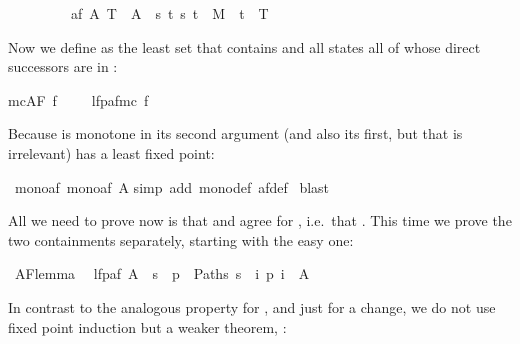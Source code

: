 \begin{isabellebody}
\ \ \ \ \ \ \ \ \ {\isachardoublequote}af\ A\ T\ {\isasymequiv}\ A\ {\isasymunion}\ {\isacharbraceleft}s{\isachardot}\ {\isasymforall}t{\isachardot}\ {\isacharparenleft}s{\isacharcomma}\ t{\isacharparenright}\ {\isasymin}\ M\ {\isasymlongrightarrow}\ t\ {\isasymin}\ T{\isacharbraceright}{\isachardoublequote}%
\begin{isamarkuptext}%
\noindent
Now we define  as the least set  that contains
 and all states all of whose direct successors are in :%
\end{isamarkuptext}%
{\isachardoublequote}mc{\isacharparenleft}AF\ f{\isacharparenright}\ \ \ \ {\isacharequal}\ lfp{\isacharparenleft}af{\isacharparenleft}mc\ f{\isacharparenright}{\isacharparenright}{\isachardoublequote}%
\begin{isamarkuptext}%
\noindent
Because  is monotone in its second argument (and also its first, but
that is irrelevant)  has a least fixed point:%
\end{isamarkuptext}%
\ mono{\isacharunderscore}af{\isacharcolon}\ {\isachardoublequote}mono{\isacharparenleft}af\ A{\isacharparenright}{\isachardoublequote}\isanewline
{}simp\ add{\isacharcolon}\ mono{\isacharunderscore}def\ af{\isacharunderscore}def{\isacharparenright}\isanewline
{}\ blast\isanewline
{}%
\begin{isamarkuptext}%
All we need to prove now is that  and \isa{{\isasymTurnstile}}
agree for , i.e.\ that . This time we prove the two containments separately, starting
with the easy one:%
\end{isamarkuptext}%
\ AF{\isacharunderscore}lemma{}{\isacharcolon}\isanewline
\ \ {\isachardoublequote}lfp{\isacharparenleft}af\ A{\isacharparenright}\ {\isasymsubseteq}\ {\isacharbraceleft}s{\isachardot}\ {\isasymforall}\ p\ {\isasymin}\ Paths\ s{\isachardot}\ {\isasymexists}\ i{\isachardot}\ p\ i\ {\isasymin}\ A{\isacharbraceright}{\isachardoublequote}%
\begin{isamarkuptxt}%
\noindent
In contrast to the analogous property for , and just
for a change, we do not use fixed point induction but a weaker theorem,
:
\begin{isabelle}%

\end{isabelle}
\end{isamarkuptxt}
\end{isabellebody}
